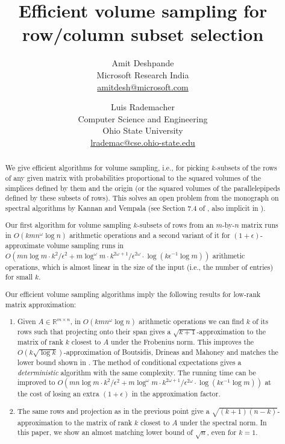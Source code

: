 \documentclass[11pt]{article}
\title{Efficient volume sampling for row/column subset selection}
\author{Amit Deshpande \\
Microsoft Research India \\
\url{amitdesh@microsoft.com}
\and
Luis Rademacher \\
Computer Science and Engineering \\
Ohio State University \\
\url{lrademac@cse.ohio-state.edu}}
\date{}
\def\reals{\mathbb{R}}
\def\eps{\epsilon}
\begin{document}
\maketitle

\begin{abstract}
We give efficient algorithms for volume sampling, i.e., for picking $k$-subsets of the rows of any given matrix with probabilities proportional to the squared volumes of the simplices defined by them and the origin (or the squared volumes of the parallelepipeds defined by these subsets of rows).
This solves an open problem from the monograph on spectral algorithms by Kannan and Vempala (see Section $7.4$ of \cite{KV}, also implicit in \cite{BDM, DRVW}).

Our first algorithm for volume sampling $k$-subsets of rows from an $m$-by-$n$ matrix runs in $O(kmn^\omega \log n)$ arithmetic operations and a second variant of it for $(1+\eps)$-approximate volume sampling runs in $O(mn \log m \cdot k^{2}/\eps^{2} + m \log^{\omega} m \cdot k^{2\omega+1}/\eps^{2\omega} \cdot \log(k \eps^{-1} \log m))$ arithmetic operations, which is almost linear in the size of the input (i.e., the number of entries) for small $k$.

Our efficient volume sampling algorithms imply the following results for low-rank matrix approximation:
\begin{enumerate}
\item Given $A \in \reals^{m \times n}$, in $O(kmn^{\omega} \log n)$ arithmetic operations we can find $k$ of its rows such that projecting onto their span gives a $\sqrt{k+1}$-approximation to the matrix of rank $k$ closest to $A$ under the Frobenius norm. This improves the $O(k \sqrt{\log k})$-approximation of Boutsidis, Drineas and Mahoney \cite{BDM} and matches the lower bound shown in \cite{DRVW}. The method of conditional expectations gives a \emph{deterministic} algorithm with the same complexity. The running time can be improved to $O(mn \log m \cdot k^{2}/\eps^{2} + m \log^{\omega} m \cdot k^{2\omega+1}/\eps^{2\omega}  \cdot \log(k \eps^{-1} \log m))$ at the cost of losing an extra $(1+\eps)$ in the approximation factor.
\item The same rows and projection as in the previous point give a $\sqrt{(k+1)(n-k)}$-approximation to the matrix of rank $k$ closest to $A$ under the spectral norm. In this paper, we show an almost matching lower bound of $\sqrt{n}$, even for $k=1$.
\end{enumerate}
\end{abstract}
\end{document}
